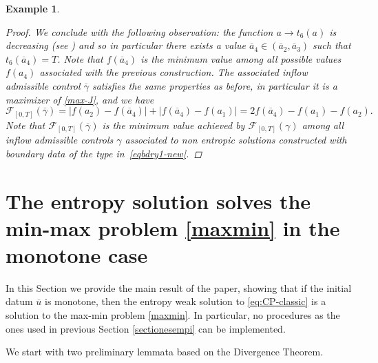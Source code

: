 \documentclass[a4paper, 10pt, final]{article}
\newtheorem{example}{Example}[section]
\newcommand{\abs}[1]{\left|#1\right|}
\begin{document}
\begin{example}
\begin{proof}
  
  
  
  
  
  
We conclude with the following observation: the function $a \to t_6(a)$ is decreasing (see ) and so in particular there exists a 
value 
$\overline a_4\in (\overline a_2, \overline a_3)$ such that $t_6(\overline a_4)=T$. Note that $f(\overline a_4)$ is the minimum value among all possible values $f(a_4)$ associated with the previous construction. The   associated inflow admissible control $
\overline\gamma$ 
 satisfies the same properties as before, in particular it is a maximizer of \eqref{max-J},  and we have
\[
    \mathcal{F}_{[0,T]} (\overline\gamma) = \abs{f(a_2) - f(\overline a_4)} + \abs{f(\overline a_4) - f(a_1)}
    =  2f(\overline a_4)-f(a_1) -f(a_2).
  \] Note that 
  $\mathcal{F}_{[0,T]} (\overline\gamma)$ is the minimum  value achieved by $\mathcal{F}_{[0,T]} (\gamma)$ among all inflow admissible controls $\gamma$ associated to non entropic solutions 
  constructed with 
  boundary data of the type in~\eqref{eqbdry1-new}.
  
\end{proof}
\end{example}
 

 
\section{The entropy solution solves the min-max problem \texorpdfstring{\eqref{maxmin}}{} in the monotone case}
\label{entrsolvminmax}
In this Section we provide the main result of the paper, showing that if the initial datum $\overline{u}$ is 
 monotone, then the entropy weak solution to \eqref{eq:CP-classic} is a solution to the max-min problem \eqref{maxmin}. 
 In particular, no procedures as the ones used in previous Section \ref{sectionesempi} can be implemented.  


We start with  two preliminary lemmata based on the Divergence Theorem.
\end{document}
